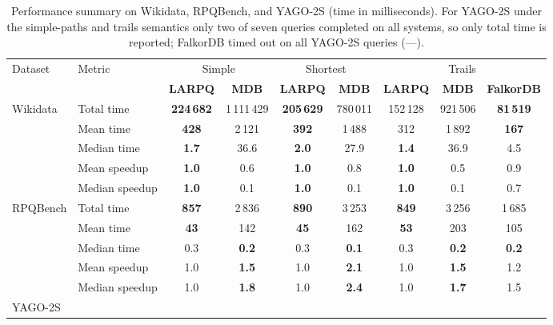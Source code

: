 \begin{table}[t]
	\centering
	\caption{Performance summary on Wikidata, RPQBench, and YAGO-2S (time in milliseconds). For YAGO-2S under the simple-paths and trails semantics only two of seven queries completed on all systems, so only total time is reported; FalkorDB timed out on all YAGO-2S queries (---).}
	\label{tab:results}
	\begin{tabular}{|l|l|c c|c c|c c c|}
		\hline
		\multirow{2}{*}{Dataset} & \multirow{2}{*}{Metric} & \multicolumn{2}{|c|}{Simple} & \multicolumn{2}{|c|}{Shortest} & \multicolumn{3}{|c|}{Trails} \\
		 & & \textbf{LARPQ} & \textbf{MDB} & \textbf{LARPQ} & \textbf{MDB} & \textbf{LARPQ} & \textbf{MDB} & \textbf{FalkorDB} \\
		\hline
		\hline
		\multirow{5}{*}{Wikidata}
		& Total time     & \textbf{224\,682} & 1\,111\,429 & \textbf{205\,629} & 780\,011 & 152\,128     & 921\,506 & \textbf{81\,519} \\
		& Mean time      & \textbf{428}      & 2\,121      & \textbf{392}      & 1\,488   & 312          & 1\,892   & \textbf{167}     \\
		& Median time    & \textbf{1.7}      & 36.6        & \textbf{2.0}      & 27.9     & \textbf{1.4} & 36.9     & 4.5              \\
		& Mean speedup   & \textbf{1.0}      & 0.6         & \textbf{1.0}      & 0.8      & \textbf{1.0} & 0.5      & 0.9              \\
		& Median speedup & \textbf{1.0}      & 0.1         & \textbf{1.0}      & 0.1      & \textbf{1.0} & 0.1      & 0.7              \\
		\hline
		\multirow{5}{*}{RPQBench}
		& Total time     & \textbf{857} & 2\,836       & \textbf{890} & 3\,253       & \textbf{849} & 3\,256       & 1\,685       \\
		& Mean time      & \textbf{43}  & 142          & \textbf{45}  & 162          & \textbf{53}  & 203          & 105          \\
		& Median time    & 0.3          & \textbf{0.2} & 0.3          & \textbf{0.1} & 0.3          & \textbf{0.2} & \textbf{0.2} \\
		& Mean speedup   & 1.0          & \textbf{1.5} & 1.0          & \textbf{2.1} & 1.0          & \textbf{1.5} & 1.2          \\
		& Median speedup & 1.0          & \textbf{1.8} & 1.0          & \textbf{2.4} & 1.0          & \textbf{1.7} & 1.5          \\
		\hline
		\multirow{5}{*}{YAGO-2S}

\end{tabular}
\end{table}
